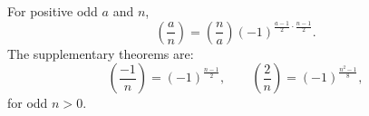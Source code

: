 For positive odd $a$ and $n$,
$$\left(\frac{a}{n}\right) = \left(\frac{n}{a}\right) (-1)^{\frac{a-1}{2} \cdot \frac{n-1}{2}}.$$
The supplementary theorems are:
$$\left(\frac{-1}{n}\right) = (-1)^{\frac{n-1}{2}}, \qquad
\left(\frac{2}{n}\right) = (-1)^{\frac{n^2-1}{8}},$$
for odd $n > 0$.
